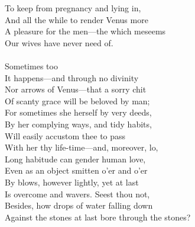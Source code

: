 To keep from pregnancy and lying in,\\
And all the while to render Venus more\\
A pleasure for the men—the which meseems\\
Our wives have never need of.\\
\\
Sometimes too\\
It happens—and through no divinity\\
Nor arrows of Venus—that a sorry chit\\
Of scanty grace will be beloved by man;\\
For sometimes she herself by very deeds,\\
By her complying ways, and tidy habits,\\
Will easily accustom thee to pass\\
With her thy life-time—and, moreover, lo,\\
Long habitude can gender human love,\\
Even as an object smitten o'er and o'er\\
By blows, however lightly, yet at last\\
Is overcome and wavers. Seest thou not,\\
Besides, how drops of water falling down\\
Against the stones at last bore through the stones?




